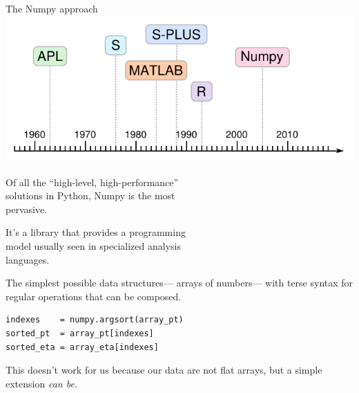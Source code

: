 \documentclass[aspectratio=169]{beamer}
\begin{document}
\begin{frame}[fragile]{The Numpy approach}
\vspace{0.5 cm}
\hfill \includegraphics[height=3 cm]{apl-timeline.pdf}

\vspace{-3 cm}
Of all the ``high-level, high-performance'' \\
solutions in Python, Numpy is the most \\
pervasive.

\vspace{0.5 cm}
It's a library that provides a programming \\
model usually seen in specialized analysis \\
languages.

\vspace{0.5 cm}
The simplest possible data structures--- arrays of numbers--- with terse syntax for regular operations that can be composed.

\small
\begin{center}
\begin{minipage}{0.75\linewidth}
\begin{verbatim}
indexes    = numpy.argsort(array_pt)
sorted_pt  = array_pt[indexes]
sorted_eta = array_eta[indexes]
\end{verbatim}
\end{minipage}
\end{center}

This doesn't work for us because our data are not flat arrays, but a simple extension {\it can be.}
\end{frame}
\end{document}
